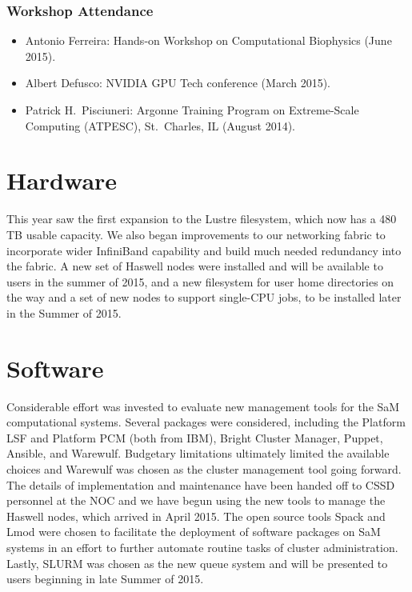 \subsubsection{Workshop Attendance}
\begin{itemize}
    \item Antonio Ferreira: Hands-on Workshop on Computational Biophysics (June 2015).

    \item Albert Defusco: NVIDIA GPU Tech conference (March 2015).

    \item Patrick H.\ Pisciuneri: Argonne Training Program on Extreme-Scale Computing (ATPESC), St.\ Charles, IL (August 2014).

\end{itemize}

\section{Hardware}
This year saw the first expansion to the Lustre filesystem, which now has a 480 TB usable capacity.  We also began improvements to our networking fabric to incorporate wider InfiniBand capability and build much needed redundancy into the fabric.  A new set of Haswell nodes were installed and will be available to users in the summer of 2015, and a new filesystem for user home directories on the way and a set of new nodes to support single-CPU jobs, to be installed later in the Summer of 2015.

\section{Software}
Considerable effort was invested to evaluate new management tools for the SaM computational systems.  Several packages were considered, including the Platform LSF and Platform PCM (both from IBM), Bright Cluster Manager, Puppet, Ansible, and Warewulf.  Budgetary limitations ultimately limited the available choices and Warewulf was chosen as the cluster management tool going forward. The details of implementation and maintenance have been handed off to CSSD personnel at the NOC and we have begun using the new tools to manage the
Haswell nodes, which arrived in April 2015.  The open source tools Spack and
Lmod were chosen to facilitate the deployment of software packages on SaM
systems in an effort to further automate routine tasks of cluster
administration.  Lastly, SLURM was chosen as the new queue system and will be
presented to users beginning in late Summer of 2015.

